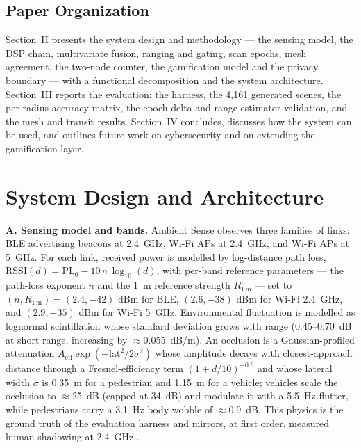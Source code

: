 \documentclass[journal,10pt]{IEEEtran}
\begin{document}
\subsection{Paper Organization}
Section~II presents the system design and methodology --- the sensing model, the DSP chain,
multivariate fusion, ranging and gating, scan epochs, mesh agreement, the
two-node counter, the gamification model and the privacy boundary --- with a
functional decomposition and the system architecture. Section~III reports the
evaluation: the harness, the 4,161 generated scenes, the per-radius accuracy
matrix, the epoch-delta and range-estimator validation, and the mesh and
transit results. Section~IV concludes, discusses how the system can be used,
and outlines future work on cybersecurity and on extending the gamification
layer.

\section{System Design and Architecture}

\textbf{A. Sensing model and bands.} Ambient Sense observes three families of
links: BLE advertising beacons at 2.4~GHz, Wi-Fi APs at 2.4~GHz, and Wi-Fi APs
at 5~GHz. For each link, received power is modelled by log-distance path loss,
$\mathrm{RSSI}(d) = \mathrm{PL}_0 - 10\,n\,\log_{10}(d)$, with per-band
reference parameters --- the path-loss exponent $n$ and the 1~m reference
strength $R_{1\,\mathrm{m}}$ --- set to $(n, R_{1\,\mathrm{m}}) = (2.4, -42)$
dBm for BLE, $(2.6, -38)$ dBm for Wi-Fi 2.4~GHz, and $(2.9, -35)$ dBm for Wi-Fi
5~GHz. Environmental fluctuation is modelled as lognormal scintillation whose
standard deviation grows with range (0.45--0.70~dB at short range, increasing by
$\approx$0.055~dB/m). An occlusion is a Gaussian-profiled attenuation
$A_{\mathrm{eff}}\exp(-\mathrm{lat}^2/2\sigma^2)$ whose amplitude decays with
closest-approach distance through a Fresnel-efficiency term $(1+d/10)^{-0.6}$
and whose lateral width $\sigma$ is 0.35~m for a pedestrian and 1.15~m for a
vehicle; vehicles scale the occlusion to $\approx$25~dB (capped at 34~dB) and
modulate it with a 5.5~Hz flutter, while pedestrians carry a 3.1~Hz body wobble
of $\approx$0.9~dB. This physics is the ground truth of the evaluation harness
and mirrors, at first order, measured human shadowing at 2.4~GHz
\cite{januszkiewicz2018}.
\end{document}
